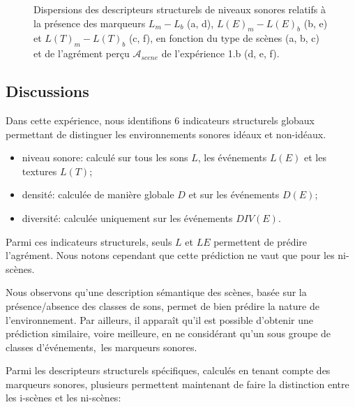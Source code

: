 \begin{figure}[t]
       \caption{Dispersions  des descripteurs structurels de niveaux sonores relatifs à la présence des marqueurs $L_m-L_b$ (a, d), $L(E)_m-L(E)_b$ (b, e) et $L(T)_m-L(T)_b$ (c, f), en fonction du type de scènes (a, b, c) et de l'agrément perçu $\mathcal{A}_{scene}$ de l'expérience 1.b (d, e, f).}\label{fig:soundlevelMarkerDiff}
\end{figure}

\subsection{Discussions} 

Dans cette expérience, nous identifions 6 indicateurs structurels globaux permettant de distinguer les environnements sonores idéaux et non-idéaux.

\begin{itemize}
\item niveau sonore: calculé sur tous les sons $L$, les événements $L(E)$ et les textures $L(T)$; 
\item densité: calculée de manière globale $D$ et sur les événements $D(E)$;
\item diversité: calculée uniquement sur les événements $DIV(E)$.
\end{itemize}

Parmi ces indicateurs structurels, seuls $L$ et $LE$ permettent de prédire l'agrément. Nous notons cependant que cette prédiction ne vaut que pour les ni-scènes. 

Nous observons qu'une description sémantique des scènes, basée sur la présence/absence des classes de sons, permet de bien prédire la nature de l'environnement. Par ailleurs, il apparaît qu'il est possible d'obtenir une prédiction similaire, voire meilleure, en ne considérant qu'un sous groupe de classes d'événements,\ie~les marqueurs sonores.

Parmi les descripteurs structurels spécifiques, calculés en tenant compte des marqueurs sonores, plusieurs permettent maintenant de faire la distinction entre les i-scènes et les ni-scènes:

